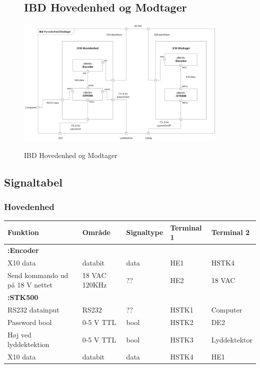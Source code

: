 \begin{figure}[htbp] \centering
\subsection{IBD Hovedenhed og Modtager}
{\includegraphics[width=0.9\textwidth]{billeder/diagrammer/IBD_Hovedenhed_Modtager}}
\caption{IBD Hovedenhed og Modtager}
\label{lab:ibdhovedenhedmodtager}
\end{figure}

\subsection{Signaltabel}

\subsubsection{Hovedenhed}
\begin{tabular}{|p{3cm}|p{}|p{}|p{}|p{}|}
\hline 
\textbf{Funktion} &\textbf{Område} &\textbf{Signaltype} &\textbf{Terminal 1} &\textbf{Terminal 2} \\ 
\hline 
\multicolumn{5}{|l|}{\textbf{:Encoder}} \\ 
\hline 
X10 data &databit &data &HE1 &HSTK4\\ 
\hline 
Send kommando ud på 18 V nettet &18 VAC \newline 120KHz &?? &HE2 &18 VAC\\ 
\hline 
\multicolumn{5}{|l|}{\textbf{:STK500}} \\ 
\hline 
RS232 datainput &RS232 &?? &HSTK1 &Computer\\ 
\hline 
Password bool  &0-5 V TTL &bool &HSTK2 &DE2\\ 
\hline 
Høj ved lyddektektion &0-5 V TTL &bool &HSTK3 &Lyddektektor\\ 
\hline 
X10 data &databit &data &HSTK4 &HE1\\ 
\hline 
\end{tabular} 

